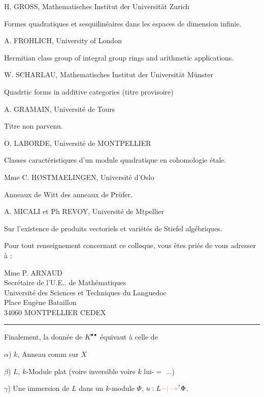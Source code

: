 H. GROSS, Mathematisches Institut der Universität Zurich

Formes quadratiques et sesquilinéaires dans les espaces de dimension infinie.

A. FROHLICH, University of London

Hermitian class group of integral group rings and arithmetic applications.

W. SCHARLAU, Mathematisches Institut der Universität Münster

Quadrtic forms in additive categories (titre provisoire)

A. GRAMAIN, Université de Tours

Titre non parvenu.

O. LABORDE, Université de MONTPELLIER

Classes caractéristiques d'un module quadratique en cohomologie étale.

Mme C. HØSTMAELINGEN, Université d'Oslo

Anneaux de Witt des anneaux de Prüfer.

A. MICALI et Ph REVOY, Université de Mtpellier

Sur l'existence de produits vectoriels et variétés de Stiefel algébriques.

Pour tout renseignement concernant ce colloque, vous êtes priés de vous adresser à :

Mme P. ARNAUD\\
Secrétaire de l'U.E.. de Mathématiques\\
Université des Sciences et Techniques du Languedoc\\
Place Eugène Bataillon\\
34060 MONTPELLIER CEDEX

\begin{center}\rule{2.3cm}{0.4pt}\end{center}

Finalement, la donnée de $K^{\bullet\bullet}$ équivaut à celle de

$\alpha$) $k$, Anneau comm sur $X$

$\beta$) $L$, $k$-Module plat (voire inversible voire $k$ lui-$=$ ...)

$\gamma$) Une immersion de $L$ dans un $k$-module $\Phi$, $u:L\unsure{\mathord{-}|\to}\Phi$.

